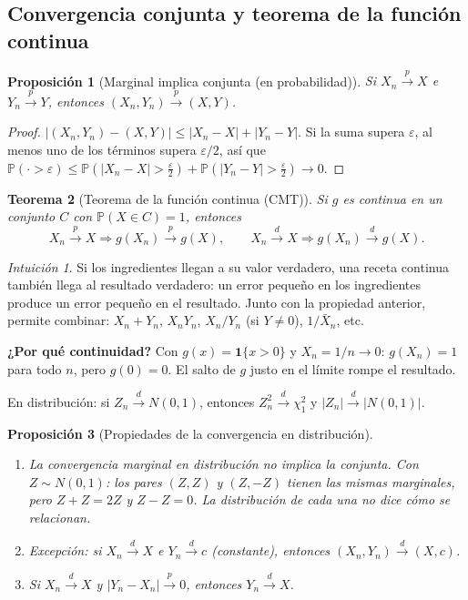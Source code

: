 \documentclass[11pt,a4paper]{article}
\theoremstyle{plain}
\newtheorem{teorema}{Teorema}[section]
\newtheorem{proposicion}[teorema]{Proposición}
\theoremstyle{definition}
\theoremstyle{remark}
\newtheorem*{intuicion}{Intuición}
\renewcommand{\P}{\mathbb{P}}
\newcommand{\cp}{\xrightarrow{\;p\;}}
\newcommand{\cd}{\xrightarrow{\;d\;}}
\begin{document}
\subsection{Convergencia conjunta y teorema de la función continua}

\begin{proposicion}[Marginal implica conjunta (en probabilidad)]\label{prop:conj}
Si $X_n\cp X$ e $Y_n\cp Y$, entonces $(X_n,Y_n)\cp(X,Y)$.
\end{proposicion}
\begin{proof}
$|(X_n,Y_n)-(X,Y)|\le|X_n-X|+|Y_n-Y|$. Si la suma supera $\varepsilon$, al menos uno de los
términos supera $\varepsilon/2$, así que
$\P(\cdot>\varepsilon)\le\P(|X_n-X|>\tfrac\varepsilon2)+\P(|Y_n-Y|>\tfrac\varepsilon2)\to0$.
\end{proof}

\begin{teorema}[Teorema de la función continua (CMT)]\label{teo:cmt}
Si $g$ es continua en un conjunto $C$ con $\P(X\in C)=1$, entonces
\[
X_n\cp X\Rightarrow g(X_n)\cp g(X),\qquad X_n\cd X\Rightarrow g(X_n)\cd g(X).
\]
\end{teorema}

\begin{intuicion}
Si los ingredientes llegan a su valor verdadero, una receta continua también llega al
resultado verdadero: un error pequeño en los ingredientes produce un error pequeño en el
resultado. Junto con la propiedad anterior, permite combinar: $X_n+Y_n$, $X_nY_n$,
$X_n/Y_n$ (si $Y\neq0$), $1/\bar X_n$, etc.

\textbf{¿Por qué continuidad?} Con $g(x)=\mathbf 1\{x>0\}$ y $X_n=1/n\to0$: $g(X_n)=1$ para todo
$n$, pero $g(0)=0$. El salto de $g$ justo en el límite rompe el resultado.

En distribución: si $Z_n\cd N(0,1)$, entonces $Z_n^2\cd\chi^2_1$ y $|Z_n|\cd|N(0,1)|$.
\end{intuicion}

\begin{proposicion}[Propiedades de la convergencia en distribución]\label{prop:propd}\leavevmode
\begin{enumerate}
  \item La convergencia marginal en distribución \emph{no} implica la conjunta. Con
        $Z\sim N(0,1)$: los pares $(Z,Z)$ y $(Z,-Z)$ tienen las mismas marginales, pero
        $Z+Z=2Z$ y $Z-Z=0$. La distribución de cada una no dice cómo se relacionan.
  \item Excepción: si $X_n\cd X$ e $Y_n\cd c$ (constante), entonces $(X_n,Y_n)\cd(X,c)$.
  \item Si $X_n\cd X$ y $|Y_n-X_n|\cp0$, entonces $Y_n\cd X$.
\end{enumerate}
\end{proposicion}
\end{document}

